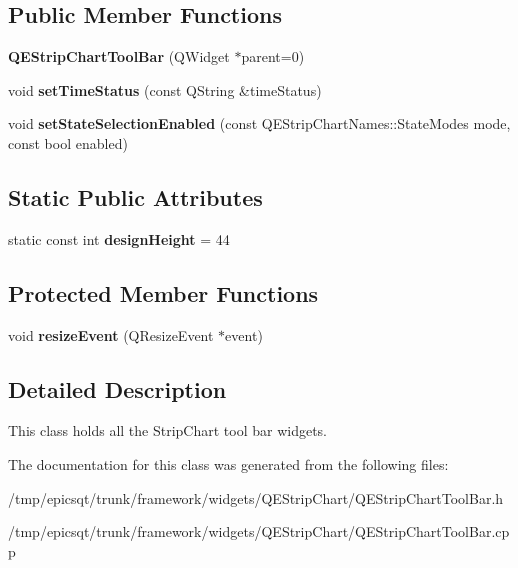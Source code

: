 \subsection*{Public Member Functions}
\begin{DoxyCompactItemize}
\item 
\hypertarget{classQEStripChartToolBar_a34d6d32b0a6a3e5dd23b5aa090d8936c}{
{\bfseries QEStripChartToolBar} (QWidget $\ast$parent=0)}
\label{classQEStripChartToolBar_a34d6d32b0a6a3e5dd23b5aa090d8936c}

\item 
\hypertarget{classQEStripChartToolBar_a2a43626e4e93ca85888eb83bb8ce2c31}{
void {\bfseries setTimeStatus} (const QString \&timeStatus)}
\label{classQEStripChartToolBar_a2a43626e4e93ca85888eb83bb8ce2c31}

\item 
\hypertarget{classQEStripChartToolBar_a4366fc0ae285b06b5a3242d7bc9613ac}{
void {\bfseries setStateSelectionEnabled} (const QEStripChartNames::StateModes mode, const bool enabled)}
\label{classQEStripChartToolBar_a4366fc0ae285b06b5a3242d7bc9613ac}

\end{DoxyCompactItemize}
\subsection*{Static Public Attributes}
\begin{DoxyCompactItemize}
\item 
\hypertarget{classQEStripChartToolBar_a14b53a54c64659312b7955ab6dfec19a}{
static const int {\bfseries designHeight} = 44}
\label{classQEStripChartToolBar_a14b53a54c64659312b7955ab6dfec19a}

\end{DoxyCompactItemize}
\subsection*{Protected Member Functions}
\begin{DoxyCompactItemize}
\item 
\hypertarget{classQEStripChartToolBar_a3beea23907587c25057e5f3d4fa90047}{
void {\bfseries resizeEvent} (QResizeEvent $\ast$event)}
\label{classQEStripChartToolBar_a3beea23907587c25057e5f3d4fa90047}

\end{DoxyCompactItemize}


\subsection{Detailed Description}
This class holds all the StripChart tool bar widgets. 

The documentation for this class was generated from the following files:\begin{DoxyCompactItemize}
\item 
/tmp/epicsqt/trunk/framework/widgets/QEStripChart/QEStripChartToolBar.h\item 
/tmp/epicsqt/trunk/framework/widgets/QEStripChart/QEStripChartToolBar.cpp\end{DoxyCompactItemize}
